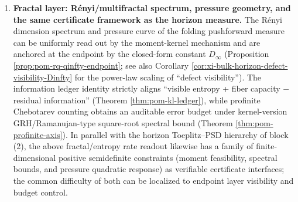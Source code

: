 \begin{enumerate}
  \item \textbf{Fractal layer: R\'enyi/multifractal spectrum, pressure geometry, and the same certificate framework as the horizon measure.}
  The R\'enyi dimension spectrum and pressure curve of the folding pushforward measure can be uniformly read out by the moment-kernel mechanism and are anchored at the endpoint by the closed-form constant \(D_\infty\) (Proposition \ref{prop:pom-rq-qinfty-endpoint}; see also Corollary \ref{cor:xi-bulk-horizon-defect-visibility-Dinfty} for the power-law scaling of ``defect visibility'').
  The information ledger identity strictly aligns ``visible entropy + fiber capacity \(-\) residual information'' (Theorem \ref{thm:pom-kl-ledger}), while profinite Chebotarev counting obtains an auditable error budget under kernel-version GRH/Ramanujan-type square-root spectral bound (Theorem \ref{thm:pom-profinite-axis}).
  In parallel with the horizon Toeplitz--PSD hierarchy of block (2), the above fractal/entropy rate readout likewise has a family of finite-dimensional positive semidefinite constraints (moment feasibility, spectral bounds, and pressure quadratic response) as verifiable certificate interfaces;
  the common difficulty of both can be localized to endpoint layer visibility and budget control.


\end{enumerate}
